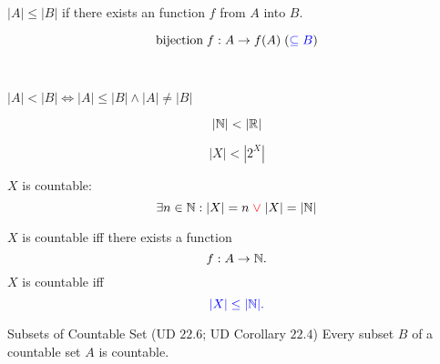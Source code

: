 \begin{frame}{}
\end{frame}

\begin{frame}{}
  \begin{definition}[$|A| \le |B|$]
    $|A| \le |B|$ if there exists an  function $f$ from $A$ into $B$.
  \end{definition}

  \pause
  \[
    \text{bijection} \;f: A \to f(A) \; (\textcolor{blue}{\subseteq B})
  \]

  \pause
  \vspace{0.80cm}
  \begin{center}
    {} \\[8pt] \pause
    {}
  \end{center}
\end{frame}

\begin{frame}{}
  \begin{definition}[$|A| < |B|$]
    $|A| < |B| \iff |A| \le |B| \land |A| \neq |B|$ 
  \end{definition}

  \pause
  \[
    |\mathbb{N}| < |\mathbb{R}|
  \]

  \[
    |X| < |2^{X}|
  \]
\end{frame}

\begin{frame}{}
  \begin{definition}
    $X$ is countable:
    \[
      \exists n \in \mathbb{N}: |X| = n \textcolor{red}{\;\lor\;} |X| = |\mathbb{N}|
    \]
  \end{definition}

  \pause
  \begin{theorem}
    $X$ is countable iff there exists a  function
    \[
      f: A \to \mathbb{N}.
    \]
    \pause
    $X$ is countable iff
    \[
      \textcolor{blue}{|X| \le |\mathbb{N}|.}
    \]
  \end{theorem}

  \pause
  \begin{exampleblock}{Subsets of Countable Set (UD $22.6$; UD Corollary $22.4$)}
    Every subset $B$ of a countable set $A$ is countable.
  \end{exampleblock}
\end{frame}

